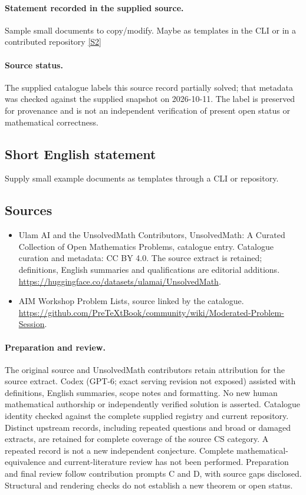 \documentclass[11pt]{article}
\begin{document}
\paragraph{Statement recorded in the supplied source.}
Sample small documents to copy/modify. Maybe as templates in the CLI or in a contributed repository \href{https://github.com/PreTeXtBook/community/wiki/Moderated-Problem-Session}{[S2]}
\paragraph{Source status.}
The supplied catalogue labels this source record partially solved; that metadata was checked against the supplied snapshot on 2026-10-11. The label is preserved for provenance and is not an independent verification of present open status or mathematical correctness.
\subsection{Short English statement}
Supply small example documents as templates through a CLI or repository.
\subsection{Sources}
\begin{itemize}
\item[S1] Ulam AI and the UnsolvedMath Contributors, UnsolvedMath: A Curated Collection of Open Mathematics Problems, catalogue entry. Catalogue curation and metadata: CC BY 4.0. The source extract is retained; definitions, English summaries and qualifications are editorial additions.
\url{https://huggingface.co/datasets/ulamai/UnsolvedMath}.
\item[S2] AIM Workshop Problem Lists, source linked by the catalogue.
\url{https://github.com/PreTeXtBook/community/wiki/Moderated-Problem-Session}.
\end{itemize}
\paragraph{Preparation and review.}
The original source and UnsolvedMath contributors retain attribution for the source extract. Codex (GPT-6; exact serving revision not exposed) assisted with definitions, English summaries, scope notes and formatting. No new human mathematical authorship or independently verified solution is asserted. Catalogue identity checked against the complete supplied registry and current repository. Distinct upstream records, including repeated questions and broad or damaged extracts, are retained for complete coverage of the source CS category. A repeated record is not a new independent conjecture. Complete mathematical-equivalence and current-literature review has not been performed. Preparation and final review follow contribution prompts C and D, with source gaps disclosed. Structural and rendering checks do not establish a new theorem or open status.
\label{end:statement}
\end{document}
